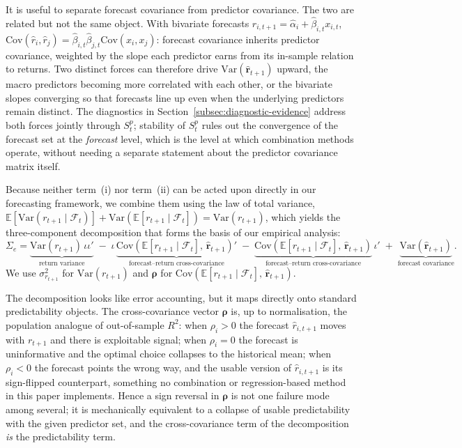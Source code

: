 \documentclass[a4paper,11pt]{article}
\begin{document}
It is useful to separate forecast covariance from predictor covariance.
The two are related but not the same object. With bivariate forecasts
$\hat{r}_{i,t+1} = \hat{\alpha}_i + \hat{\beta}_{i,t} x_{i,t}$,
$\mathrm{Cov}(\hat{r}_i, \hat{r}_j) = \hat{\beta}_{i,t}\hat{\beta}_{j,t}
\mathrm{Cov}(x_i, x_j)$: forecast covariance inherits predictor
covariance, weighted by the slope each predictor earns from its in-sample
relation to returns. Two distinct forces can therefore drive
$\mathrm{Var}(\hat{\mathbf{r}}_{t+1})$ upward, the macro predictors
becoming more correlated with each other, or the bivariate slopes
converging so that forecasts line up even when the underlying predictors
remain distinct. The diagnostics in
Section~\ref{subsec:diagnostic-evidence} address both forces jointly
through $S^p_t$; stability of $S^p_t$ rules out the convergence of the
forecast set at the \emph{forecast} level, which is the level at which
combination methods operate, without needing a separate statement about
the predictor covariance matrix itself.

Because neither term~(i) nor term~(ii) can be acted upon directly in our
forecasting framework, we combine them using the law of total variance,
$\mathbb{E}[\mathrm{Var}(r_{t+1} \mid \mathcal{F}_t)]
+ \mathrm{Var}(\mathbb{E}[r_{t+1} \mid \mathcal{F}_t])
= \mathrm{Var}(r_{t+1})$, which yields the three-component decomposition
that forms the basis of our empirical analysis:
\begin{equation}\label{eq:matrix-decomp}
    \Sigma_e
    = \underbrace{\mathrm{Var}(r_{t+1})\,\iota\iota'}_{\text{return variance}}
    \;-\; \iota\,\underbrace{\mathrm{Cov}\!\left(\mathbb{E}[r_{t+1} \mid
        \mathcal{F}_t],\,\hat{\mathbf{r}}_{t+1}\right)'}_{\text{forecast--return cross-covariance}}
    \;-\; \underbrace{\mathrm{Cov}\!\left(\mathbb{E}[r_{t+1} \mid
        \mathcal{F}_t],\,\hat{\mathbf{r}}_{t+1}\right)}_{\text{forecast--return cross-covariance}}\,\iota'
    \;+\; \underbrace{\mathrm{Var}(\hat{\mathbf{r}}_{t+1})}_{\text{forecast covariance}}.
\end{equation}
We use $\sigma_{r_{t+1}}^2$ for $\mathrm{Var}(r_{t+1})$ and
$\boldsymbol{\rho}$ for $\mathrm{Cov}(\mathbb{E}[r_{t+1} \mid
\mathcal{F}_t],\, \hat{\mathbf{r}}_{t+1})$.

The decomposition looks like error accounting, but it maps directly onto
standard predictability objects. The cross-covariance vector
$\boldsymbol{\rho}$ is, up to normalisation, the population analogue of
out-of-sample $R^2$: when $\rho_i > 0$ the forecast $\hat{r}_{i,t+1}$
moves with $r_{t+1}$ and there is exploitable signal; when $\rho_i = 0$
the forecast is uninformative and the optimal choice collapses to the
historical mean; when $\rho_i < 0$ the forecast points the wrong way, and
the usable version of $\hat{r}_{i,t+1}$ is its sign-flipped
counterpart, something no combination or regression-based method in
this paper implements. Hence a sign reversal in $\boldsymbol{\rho}$ is
not one failure mode among several; it is mechanically equivalent to a
collapse of usable predictability with the given predictor set, and the
cross-covariance term of the decomposition \emph{is} the predictability
term.
\end{document}
